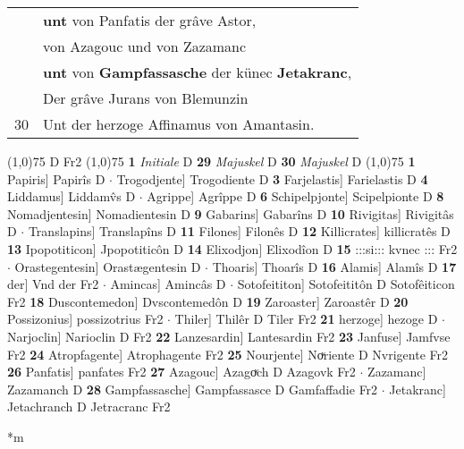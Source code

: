 \documentclass[8pt,a4paper,notitlepage]{article}
\begin{document}
\begin{table}[ht]
\begin{minipage}[t]{0.5\linewidth}
\begin{tabular}{rl}
 & \textbf{unt} von Panfatis der grâve Astor,\\ 
 & von Azagouc und von Zazamanc\\ 
 & \textbf{unt} von \textbf{Gampfassasche} der künec \textbf{Jetakranc},\\ 
 & Der grâve Jurans von Blemunzin\\ 
30 & Unt der herzoge Affinamus von Amantasin.\\ 
\end{tabular}
\scriptsize
\line(1,0){75} \newline
D Fr2 \newline
\line(1,0){75} \newline
\textbf{1} \textit{Initiale} D  \textbf{29} \textit{Majuskel} D  \textbf{30} \textit{Majuskel} D  \newline
\line(1,0){75} \newline
\textbf{1} Papiris] Papirîs D  $\cdot$ Trogodjente] Trogodiente D \textbf{3} Farjelastis] Farielastis D \textbf{4} Liddamus] Liddamv̂s D  $\cdot$ Agrippe] Agrîppe D \textbf{6} Schipelpjonte] Scipelpionte D \textbf{8} Nomadjentesin] Nomadientesin D \textbf{9} Gabarins] Gabarîns D \textbf{10} Rivigitas] Rivigitâs D  $\cdot$ Translapins] Translapîns D \textbf{11} Filones] Filonês D \textbf{12} Killicrates] killicratês D \textbf{13} Ipopotiticon] Jpopotiticôn D \textbf{14} Elixodjon] Elixodîon D \textbf{15} :::si::: kvnec ::: Fr2  $\cdot$ Orastegentesin] Orastægentesin D  $\cdot$ Thoaris] Thoarîs D \textbf{16} Alamis] Alamîs D \textbf{17} der] Vnd der Fr2  $\cdot$ Amincas] Amincâs D  $\cdot$ Sotofeititon] Sotofeititôn D Sotofêiticon Fr2 \textbf{18} Duscontemedon] Dvscontemedôn D \textbf{19} Zaroaster] Zaroastêr D \textbf{20} Possizonius] possizotrius Fr2  $\cdot$ Thiler] Thilêr D Tiler Fr2 \textbf{21} herzoge] hezoge D  $\cdot$ Narjoclin] Narioclin D Fr2 \textbf{22} Lanzesardin] Lantesardin Fr2 \textbf{23} Janfuse] Jamfvse Fr2 \textbf{24} Atropfagente] Atrophagente Fr2 \textbf{25} Nourjente] Noͮriente D Nvrigente Fr2 \textbf{26} Panfatis] panfates Fr2 \textbf{27} Azagouc] Azagoͮch D Azagovk Fr2  $\cdot$ Zazamanc] Zazamanch D \textbf{28} Gampfassasche] Gampfassasce D Gamfaffadie Fr2  $\cdot$ Jetakranc] Jetachranch D Jetracranc Fr2 \newline
\end{minipage}
\hspace{0.5cm}
\begin{minipage}[t]{0.5\linewidth}
\small
\begin{center}*m
\end{center}

\end{minipage}
\end{table}
\end{document}
